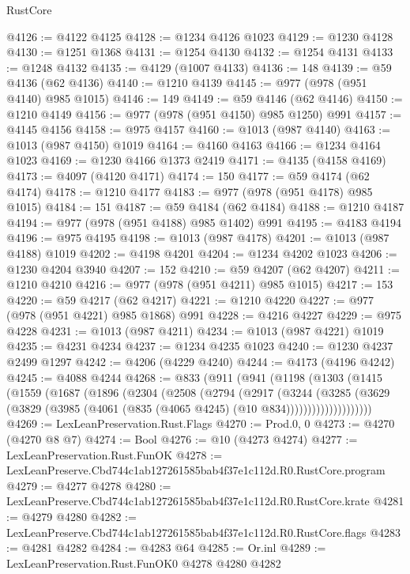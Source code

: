 \begin{lexlean}{RustCore}
\begin{coremodule}
@4126 := @4122 @4125
@4128 := @1234 @4126 @1023
@4129 := @1230 @4128
@4130 := @1251 @1368
@4131 := @1254 @4130
@4132 := @1254 @4131
@4133 := @1248 @4132
@4135 := @4129 (@1007 @4133)
@4136 := 148
@4139 := @59 @4136 (@62 @4136)
@4140 := @1210 @4139
@4145 := @977 (@978 (@951 @4140) @985 @1015)
@4146 := 149
@4149 := @59 @4146 (@62 @4146)
@4150 := @1210 @4149
@4156 := @977 (@978 (@951 @4150) @985 @1250) @991
@4157 := @4145 @4156
@4158 := @975 @4157
@4160 := @1013 (@987 @4140)
@4163 := @1013 (@987 @4150) @1019
@4164 := @4160 @4163
@4166 := @1234 @4164 @1023
@4169 := @1230 @4166 @1373 @2419
@4171 := @4135 (@4158 @4169)
@4173 := @4097 (@4120 @4171)
@4174 := 150
@4177 := @59 @4174 (@62 @4174)
@4178 := @1210 @4177
@4183 := @977 (@978 (@951 @4178) @985 @1015)
@4184 := 151
@4187 := @59 @4184 (@62 @4184)
@4188 := @1210 @4187
@4194 := @977 (@978 (@951 @4188) @985 @1402) @991
@4195 := @4183 @4194
@4196 := @975 @4195
@4198 := @1013 (@987 @4178)
@4201 := @1013 (@987 @4188) @1019
@4202 := @4198 @4201
@4204 := @1234 @4202 @1023
@4206 := @1230 @4204 @3940
@4207 := 152
@4210 := @59 @4207 (@62 @4207)
@4211 := @1210 @4210
@4216 := @977 (@978 (@951 @4211) @985 @1015)
@4217 := 153
@4220 := @59 @4217 (@62 @4217)
@4221 := @1210 @4220
@4227 := @977 (@978 (@951 @4221) @985 @1868) @991
@4228 := @4216 @4227
@4229 := @975 @4228
@4231 := @1013 (@987 @4211)
@4234 := @1013 (@987 @4221) @1019
@4235 := @4231 @4234
@4237 := @1234 @4235 @1023
@4240 := @1230 @4237 @2499 @1297
@4242 := @4206 (@4229 @4240)
@4244 := @4173 (@4196 @4242)
@4245 := @4088 @4244
@4268 := @833
    (@911
      (@941
        (@1198
          (@1303
            (@1415
              (@1559
                (@1687
                  (@1896
                    (@2304
                      (@2508
                        (@2794
                          (@2917
                            (@3244
                              (@3285
                                (@3629
                                  (@3829
                                    (@3985 (@4061 (@835 (@4065 @4245) (@10 @834))))))))))))))))))))
@4269 := LexLeanPreservation.Rust.Flags
@4270 := Prod.{0, 0}
@4273 := @4270 (@4270 @8 @7)
@4274 := Bool
@4276 := @10 (@4273 @4274)
@4277 := LexLeanPreservation.Rust.FunOK
@4278 := LexLeanPreserve.Cbd744c1ab127261585bab4f37e1c112d.R0.RustCore.program
@4279 := @4277 @4278
@4280 := LexLeanPreserve.Cbd744c1ab127261585bab4f37e1c112d.R0.RustCore.krate
@4281 := @4279 @4280
@4282 := LexLeanPreserve.Cbd744c1ab127261585bab4f37e1c112d.R0.RustCore.flags
@4283 := @4281 @4282
@4284 := @4283 @64
@4285 := Or.inl
@4289 := LexLeanPreservation.Rust.FunOK0 @4278 @4280 @4282

\end{coremodule}
\end{lexlean}
